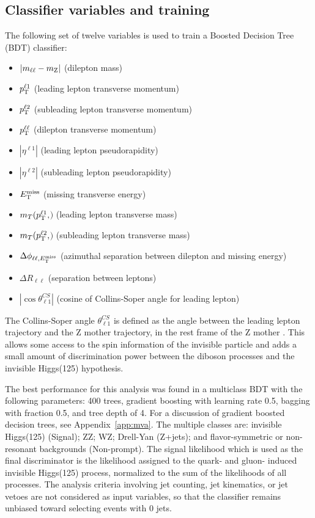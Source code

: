\subsection{Classifier variables and training} 

The following set of twelve variables is used to train a Boosted Decision Tree (BDT) classifier: 
\begin{itemize}
\item  $\left|m_{\ell\ell}-m_{\mathrm{Z}}\right|$ (dilepton mass) 
\item $p_{\mathrm{T}}^{\ell 1}$ (leading lepton transverse momentum) 
\item $p_{\mathrm{T}}^{\ell 2}$ (subleading lepton transverse momentum)
\item $p_{\mathrm{T}}^{\ell\ell}$ (dilepton transverse momentum)
\item $| \eta^{\ell 1} |$ (leading lepton pseudorapidity)
\item $| \eta^{\ell 2} |$ (subleading lepton pseudorapidity)
\item $E_\mathrm{T}^{\mathrm{miss}}$       (missing transverse energy)
\item $m_{T}(p_{\mathrm{T}}^{\ell 1}, $\met$)$ (leading lepton transverse mass)
\item $m_{T}(p_{\mathrm{T}}^{\ell 2}, $\met$)$ (subleading lepton transverse mass)
\item $\Delta \phi_{\ell\ell,E_\mathrm{T}^{\mathrm{miss}}}$ (azimuthal separation between dilepton and missing energy) 
\item $\Delta R_{\ell\ell}$ (separation between leptons)
\item $| \cos \theta^{CS}_{\ell1} |$ (cosine of Collins-Soper angle for leading lepton)
\end{itemize}

The Collins-Soper angle $\theta^{CS}_{\ell1}$ is defined as the angle between
the leading lepton trajectory and the Z mother trajectory, 
in the rest frame of the Z mother \cite{Collins:1984kg}.
This allows some access to the spin information of the invisible particle and adds a small amount of discrimination power between the diboson processes and the invisible Higgs(125) hypothesis.

The best performance for this analysis was found in a multiclass BDT with the following parameters: 400 trees, gradient boosting with learning rate 0.5, bagging with fraction 0.5, and tree depth of 4.
For a discussion of gradient boosted decision trees, see Appendix~\ref{app:mva}.
The multiple classes are: invisible Higgs(125) (Signal); ZZ; WZ; Drell-Yan (Z+jets); and flavor-symmetric or non-resonant backgrounds (Non-prompt).
The signal likelihood which is used as the final discriminator is the likelihood assigned to the quark- and gluon- induced invisible Higgs(125) process, normalized to the sum of the likelihoods of all processes.
The analysis criteria involving jet counting, jet kinematics, or jet vetoes are not considered as input variables, so that the classifier remains unbiased toward selecting events with 0 jets.

